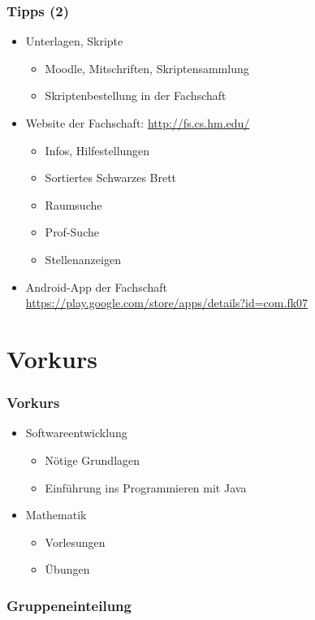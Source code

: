 \documentclass{beamer}
\begin{document}
\begin{frame}
\frametitle{Tipps (2)}
\begin{itemize}
	\item Unterlagen, Skripte
		\begin{itemize}
			\item Moodle, Mitschriften, Skriptensammlung
			\item Skriptenbestellung in der Fachschaft
		\end{itemize}
	\pause
	\item Website der Fachschaft: \scriptsize\url{http://fs.cs.hm.edu/}\normalsize
		\begin{itemize}
			\item Infos, Hilfestellungen
			\item Sortiertes Schwarzes Brett
			\item Raumsuche
			\item Prof-Suche
			\item Stellenanzeigen
		\end{itemize}
	\pause
	\item Android-App der Fachschaft\\
		\scriptsize\url{https://play.google.com/store/apps/details?id=com.fk07}\normalsize
\end{itemize}
\end{frame}


\section{Vorkurs}
\begin{frame}
\frametitle{Vorkurs}
\begin{itemize}
	\item Softwareentwicklung
		\begin{itemize}
			\item Nötige Grundlagen
			\item Einführung ins Programmieren mit Java
		\end{itemize}
	\pause
	\item Mathematik
		\begin{itemize}
			\item Vorlesungen
			\item Übungen
		\end{itemize}
\end{itemize}
\end{frame}


\begin{frame}
\frametitle{Gruppeneinteilung}
\end{frame}
\end{document}
